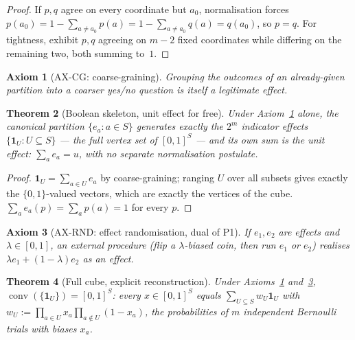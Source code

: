 \documentclass[11pt,a4paper]{article}
\newtheorem{theorem}{Theorem}[section]
\newtheorem{axiom}[theorem]{Axiom}
\newcommand{\conv}{\operatorname{conv}}
\begin{document}
    \begin{proof}
      If $p, q$ agree on every coordinate but $a_0$, normalisation forces
      $p(a_0) = 1 - \sum_{a \neq a_0} p(a) = 1 - \sum_{a \neq a_0} q(a) = q(a_0)$, so $p = q$.
      For tightness, exhibit $p, q$ agreeing on $m-2$ fixed coordinates while differing on the remaining two,
      both summing to~$1$.
    \end{proof}

    \begin{axiom}[AX-CG: coarse-graining]
      \label{ax:cg}
      Grouping the outcomes of an already-given partition into a coarser yes/no question is itself a
      legitimate effect.
    \end{axiom}

    \begin{theorem}[Boolean skeleton, unit effect for free]
      \label{thm:ea3}
      Under Axiom~\ref{ax:cg} alone, the canonical partition $\{e_a : a \in S\}$ generates exactly the
      $2^m$ indicator effects $\{\mathbf{1}_U : U \subseteq S\}$ --- the full vertex set of $[0,1]^S$ --- and
      its own sum is the unit effect: $\sum_a e_a = u$, with no separate normalisation postulate.
    \end{theorem}

    \begin{proof}
      $\mathbf{1}_U = \sum_{a \in U} e_a$ by coarse-graining; ranging $U$ over all subsets gives exactly the
      $\{0,1\}$-valued vectors, which are exactly the vertices of the cube.
      $\sum_a e_a(p) = \sum_a p(a) = 1$ for every $p$.
    \end{proof}

    \begin{axiom}[AX-RND: effect randomisation, dual of P1]
      \label{ax:rnd}
      If $e_1, e_2$ are effects and $\lambda \in [0,1]$, an external procedure (flip a $\lambda$-biased coin,
      then run $e_1$ or $e_2$) realises $\lambda e_1 + (1-\lambda) e_2$ as an effect.
    \end{axiom}

    \begin{theorem}[Full cube, explicit reconstruction]
      \label{thm:ea4}
      Under Axioms~\ref{ax:cg} and~\ref{ax:rnd}, $\conv(\{\mathbf{1}_U\}) = [0,1]^S$: every
      $x \in [0,1]^S$ equals $\sum_{U \subseteq S} w_U \mathbf{1}_U$ with
      $w_U := \prod_{a \in U} x_a \prod_{a \notin U} (1-x_a)$, the probabilities of $m$ independent Bernoulli
      trials with biases $x_a$.
    \end{theorem}
\end{document}
